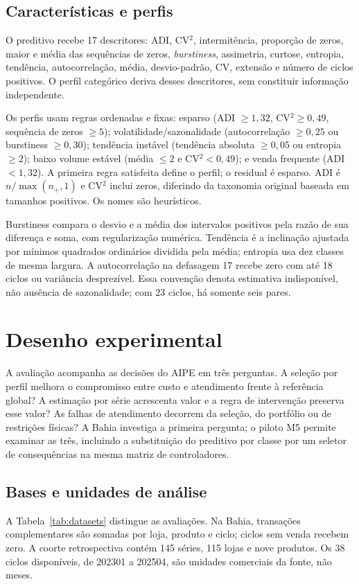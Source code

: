 \documentclass[preprint,12pt]{elsarticle}
\begin{document}
\subsection{Características e perfis}
O preditivo recebe 17 descritores: ADI, CV$^2$, intermitência, proporção de zeros, maior e média das sequências de zeros, \textit{burstiness}, assimetria, curtose, entropia, tendência, autocorrelação, média, desvio-padrão, CV, extensão e número de ciclos positivos. O perfil categórico deriva desses descritores, sem constituir informação independente.

Os perfis usam regras ordenadas e fixas: esparso (ADI $\geq1{,}32$, CV$^2\geq0{,}49$, sequência de zeros $\geq5$); volatilidade/sazonalidade (autocorrelação $\geq0{,}25$ ou burstiness $\geq0{,}30$); tendência instável (tendência absoluta $\geq0{,}05$ ou entropia $\geq2$); baixo volume estável (média $\leq2$ e CV$^2<0{,}49$); e venda frequente (ADI $<1{,}32$). A primeira regra satisfeita define o perfil; o residual é esparso. ADI é $n/\max(n_+,1)$ e CV$^2$ inclui zeros, diferindo da taxonomia original baseada em tamanhos positivos. Os nomes são heurísticos.

Burstiness compara o desvio e a média dos intervalos positivos pela razão de sua diferença e soma, com regularização numérica. Tendência é a inclinação ajustada por mínimos quadrados ordinários dividida pela média; entropia usa dez classes de mesma largura. A autocorrelação na defasagem 17 recebe zero com até 18 ciclos ou variância desprezível. Essa convenção denota estimativa indisponível, não ausência de sazonalidade; com 23 ciclos, há somente seis pares.

\section{Desenho experimental}
A avaliação acompanha as decisões do AIPE em três perguntas. A seleção por perfil melhora o compromisso entre custo e atendimento frente à referência global? A estimação por série acrescenta valor e a regra de intervenção preserva esse valor? As falhas de atendimento decorrem da seleção, do portfólio ou de restrições físicas? A Bahia investiga a primeira pergunta; o piloto M5 permite examinar as três, incluindo a substituição do preditivo por classe por um seletor de consequências na mesma matriz de controladores.
\subsection{Bases e unidades de análise}
A Tabela~\ref{tab:datasets} distingue as avaliações. Na Bahia, transações complementares são somadas por loja, produto e ciclo; ciclos sem venda recebem zero. A coorte retrospectiva contém 145 séries, 115 lojas e nove produtos. Os 38 ciclos disponíveis, de 202301 a 202504, são unidades comerciais da fonte, não meses.
\end{document}

